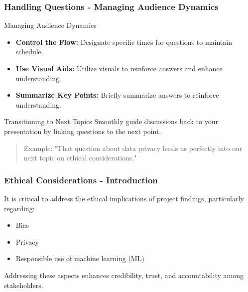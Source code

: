 \documentclass[aspectratio=169]{beamer}
\begin{document}
\begin{frame}[fragile]
    \frametitle{Handling Questions - Managing Audience Dynamics}
    \begin{block}{Managing Audience Dynamics}
        \begin{itemize}
            \item \textbf{Control the Flow:} Designate specific times for questions to maintain schedule.
            \item \textbf{Use Visual Aids:} Utilize visuals to reinforce answers and enhance understanding.
            \item \textbf{Summarize Key Points:} Briefly summarize answers to reinforce understanding.
        \end{itemize}
    \end{block}

    \begin{block}{Transitioning to Next Topics}
        Smoothly guide discussions back to your presentation by linking questions to the next point. 
        \begin{quote}
            Example: "That question about data privacy leads us perfectly into our next topic on ethical considerations."
        \end{quote}
    \end{block}
\end{frame}

\begin{frame}[fragile]
    \frametitle{Ethical Considerations - Introduction}
    It is critical to address the ethical implications of project findings, particularly regarding:
    \begin{itemize}
        \item Bias
        \item Privacy
        \item Responsible use of machine learning (ML)
    \end{itemize}
    Addressing these aspects enhances credibility, trust, and accountability among stakeholders.
\end{frame}
\end{document}
